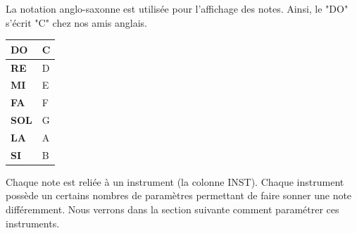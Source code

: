 \documentclass[12pt,a4paper]{article}
\begin{document}
    La notation anglo-saxonne est utilisée pour l'affichage des notes. Ainsi, le "DO" s'écrit "C" chez nos amis anglais.\medskip

        \begin{center}
            \tablelasttail{\hline}
            \begin{supertabular}{|l|l|}
            \hline
                {\bf DO} & C \\
                \hline
                {\bf RE} & D \\
                \hline
                {\bf MI} & E \\
                \hline
                {\bf FA} & F \\
                \hline
                {\bf SOL} & G \\
                \hline
                {\bf LA} & A \\
                \hline
                {\bf SI} & B \\
            \hline
            \end{supertabular}
        \end{center}


    Chaque note est reliée à un instrument (la colonne INST). Chaque instrument possède un certains nombres de paramètres permettant de faire sonner une note différemment. Nous verrons dans la section suivante comment paramétrer ces instruments.

\end{document}
